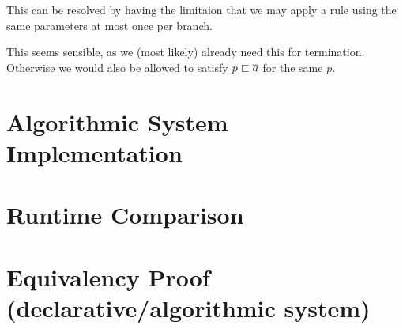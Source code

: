 \documentclass[a4paper]{article}
\begin{document}
This can be resolved by having the limitaion that we may apply
a rule using the same parameters at most once per branch.

This seems sensible, as we (most likely) already need this for termination.
Otherwise we would also be allowed to satisfy $p \sqsubset \overline{a}$ for the same $p$.

\section{Algorithmic System Implementation}
\wip

\section{Runtime Comparison}
\wip

\section{Equivalency Proof (declarative/algorithmic system)}
\wip
\end{document}
